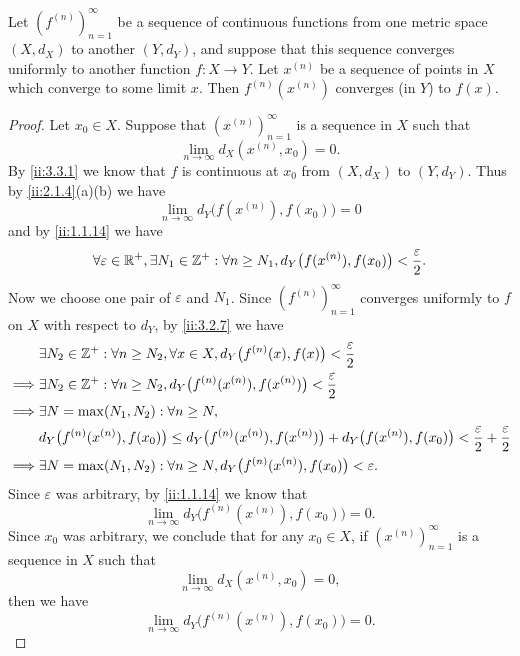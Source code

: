 \begin{prop}\label{ii:3.3.4}
  Let \((f^{(n)})_{n = 1}^\infty\) be a sequence of continuous functions from one metric space \((X, d_X)\) to another \((Y, d_Y)\), and suppose that this sequence converges uniformly to another function \(f : X \to Y\).
  Let \(x^{(n)}\) be a sequence of points in \(X\) which converge to some limit \(x\).
  Then \(f^{(n)}(x^{(n)})\) converges (in \(Y\)) to \(f(x)\).
\end{prop}

\begin{proof}
  Let \(x_0 \in X\).
  Suppose that \((x^{(n)})_{n = 1}^\infty\) is a sequence in \(X\) such that
  \[
    \lim_{n \to \infty} d_X(x^{(n)}, x_0) = 0.
  \]
  By \cref{ii:3.3.1} we know that \(f\) is continuous at \(x_0\) from \((X, d_X)\) to \((Y, d_Y)\).
  Thus by \cref{ii:2.1.4}(a)(b) we have
  \[
    \lim_{n \to \infty} d_Y\big(f(x^{(n)}), f(x_0)\big) = 0
  \]
  and by \cref{ii:1.1.14} we have
  \[
    \forall \varepsilon \in \mathbb{R}^+, \exists N_1 \in \mathbb{Z}^+ : \forall n \geq N_1, d_Y\big(f(x^{(n)}), f(x_0)\big) < \dfrac{\varepsilon}{2}.
  \]
  Now we choose one pair of \(\varepsilon\) and \(N_1\).
  Since \((f^{(n)})_{n = 1}^\infty\) converges uniformly to \(f\) on \(X\) with respect to \(d_Y\), by \cref{ii:3.2.7} we have
  \begin{align*}
             & \exists N_2 \in \mathbb{Z}^+ : \forall n \geq N_2, \forall x \in X, d_Y\big(f^{(n)}(x), f(x)\big) < \dfrac{\varepsilon}{2}                                                       \\
    \implies & \exists N_2 \in \mathbb{Z}^+ : \forall n \geq N_2, d_Y\big(f^{(n)}(x^{(n)}), f(x^{(n)})\big) < \dfrac{\varepsilon}{2}                                                            \\
    \implies & \exists N = \max(N_1, N_2) : \forall n \geq N,                                                                                                                           \\
             & d_Y\big(f^{(n)}(x^{(n)}), f(x_0)\big) \leq d_Y\big(f^{(n)}(x^{(n)}), f(x^{(n)})\big) + d_Y\big(f(x^{(n)}), f(x_0)\big) < \dfrac{\varepsilon}{2} + \dfrac{\varepsilon}{2} \\
    \implies & \exists N = \max(N_1, N_2) : \forall n \geq N, d_Y\big(f^{(n)}(x^{(n)}), f(x_0)\big) < \varepsilon.
  \end{align*}
  Since \(\varepsilon\) was arbitrary, by \cref{ii:1.1.14} we know that
  \[
    \lim_{n \to \infty} d_Y\big(f^{(n)}(x^{(n)}), f(x_0)\big) = 0.
  \]
  Since \(x_0\) was arbitrary, we conclude that for any \(x_0 \in X\), if \((x^{(n)})_{n = 1}^\infty\) is a sequence in \(X\) such that
  \[
    \lim_{n \to \infty} d_X(x^{(n)}, x_0) = 0,
  \]
  then we have
  \[
    \lim_{n \to \infty} d_Y\big(f^{(n)}(x^{(n)}), f(x_0)\big) = 0.
  \]
\end{proof}

